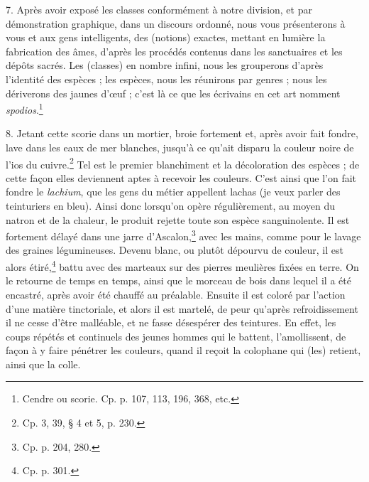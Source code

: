 \documentclass[a4paper, 11pt, oneside, polutonikogreek, french]{article}
\begin{document}
7. Après avoir exposé les classes conformément à notre division, et par démonstration graphique, dans un discours ordonné, nous vous présenterons à vous et aux gens intelligents, des (notions) exactes, mettant en lumière la fabrication des âmes, d'après les procédés contenus dans les sanctuaires et les dépôts sacrés. Les (classes) en nombre infini, nous les grouperons d'après l'identité des espèces ; les espèces, nous les réunirons par genres ; nous les dériverons des jaunes d'œuf ; c'est là ce que les écrivains en cet art nomment \emph{spodios}.\footnote{Cendre ou scorie. Cp. p. 107, 113, 196, 368, etc.}

8. Jetant cette scorie dans un mortier, broie fortement et, après avoir fait fondre, lave dans les eaux de mer blanches, jusqu'à ce qu'ait disparu la couleur noire de l'ios du cuivre.\footnote{Cp. 3, 39, § 4 et 5, p. 230.} Tel est le premier blanchiment et la décoloration des espèces ; de cette façon elles deviennent aptes à recevoir les couleurs. C'est ainsi que l'on fait fondre le \emph{lachium}, que les gens du métier appellent lachas (je veux parler des teinturiers en bleu). Ainsi donc lorsqu'on opère régulièrement, au moyen du natron et de la chaleur, le produit rejette toute son espèce sanguinolente. Il est fortement délayé dans une jarre d'Ascalon,\footnote{Cp. p. 204, 280.} avec les mains, comme pour le lavage des graines légumineuses. Devenu blanc, ou plutôt dépourvu de couleur, il est alors étiré,\footnote{Cp. p. 301.} battu avec des marteaux sur des pierres meulières fixées en terre. On le retourne de temps en temps, ainsi que le morceau de bois dans lequel il a été encastré, après avoir été chauffé au préalable. Ensuite il est coloré par l'action d'une matière tinctoriale, et alors il est martelé, de peur qu'après refroidissement il ne cesse d'être malléable, et ne fasse désespérer des teintures. En effet, les coups répétés et continuels des jeunes hommes qui le battent, l'amollissent, de façon à y faire pénétrer les couleurs, quand il reçoit la colophane qui (les) retient, ainsi que la colle.
\end{document}
